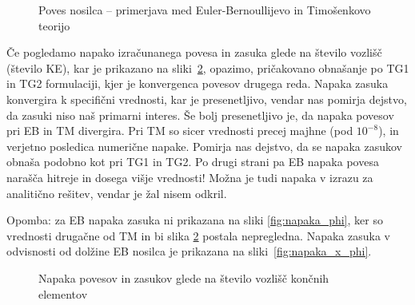 \begin{figure}
\end{figure}

\begin{figure}[ht]
    \centering
    \caption{Poves nosilca -- primerjava med Euler-Bernoullijevo in Timošenkovo teorijo}
    \label{fig:poves}
\end{figure}

Če pogledamo napako izračunanega povesa in zasuka glede na število vozlišč (število KE), kar je prikazano na sliki~\ref{fig:napaka_povesi}, opazimo, pričakovano obnašanje po TG1 in TG2 formulaciji, kjer je konvergenca povesov drugega reda. Napaka zasuka konvergira k specifični vrednosti, kar je presenetljivo, vendar nas pomirja dejstvo, da zasuki niso naš primarni interes. Še bolj presenetljivo je, da napaka povesov pri EB in TM divergira. Pri TM so sicer vrednosti precej majhne (pod $10^{-8}$), in verjetno posledica numerične napake. Pomirja nas dejstvo, da se napaka zasukov obnaša podobno kot pri TG1 in TG2. Po drugi strani pa EB napaka povesa narašča hitreje in dosega višje vrednosti! Možna je tudi napaka v izrazu za analitično rešitev, vendar je žal nisem odkril.

Opomba: za EB napaka zasuka ni prikazana na sliki \ref{fig:napaka_phi}, ker so vrednosti drugačne od TM in bi slika \ref{fig:napaka_povesi} postala nepregledna. Napaka zasuka v odvisnosti od dolžine EB nosilca je prikazana na sliki~\ref{fig:napaka_x_phi}.

\begin{figure}[ht]
    \centering
    \caption{Napaka povesov in zasukov glede na število vozlišč končnih elementov}
    \label{fig:napaka_povesi}
\end{figure}

